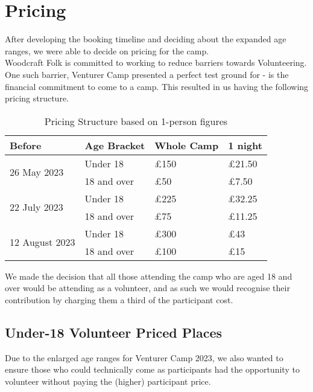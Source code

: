\chapter{Pricing}
After developing the booking timeline and deciding about the expanded age ranges, we were able to decide on pricing for the camp.\\

Woodcraft Folk is committed to working to reduce barriers towards Volunteering. One such barrier, Venturer Camp presented a perfect test ground for - is the financial commitment to come to a camp. This resulted in us having the following pricing structure.

\begin{table}[h]
    \centering
    {\RaggedRight
    \begin{tabular}{p{} p{} p{} p{}}
    \textbf{Before} & \textbf{Age Bracket} & \textbf{Whole Camp} & \textbf{1 night}\\
    \hline
    \hline
    \multirow{2}{*}{26 May 2023} & Under 18 & \pounds150 & \pounds21.50\\
    \cline{2-4}
    & 18 and over & \pounds50 & \pounds7.50\\
    \hline
    \multirow{2}{*}{22 July 2023} & Under 18 & \pounds225 & \pounds32.25\\
    \cline{2-4}
    & 18 and over & \pounds75 & \pounds11.25\\
    \hline
    \multirow{2}{*}{12 August 2023} & Under 18 & \pounds300 & \pounds43\\
    \cline{2-4}
    & 18 and over & \pounds100 & \pounds15\\
    \hline
    \end{tabular}
    } %
    \caption{Pricing Structure based on 1-person figures}
\end{table}
We made the decision that all those attending the camp who are aged 18 and over would be attending as a volunteer, and as such we would recognise their contribution by charging them a third of the participant cost. 

\section{Under-18 Volunteer Priced Places}
Due to the enlarged age ranges for Venturer Camp 2023, we also wanted to ensure those who could technically come as participants had the opportunity to volunteer without paying the (higher) participant price.\\

